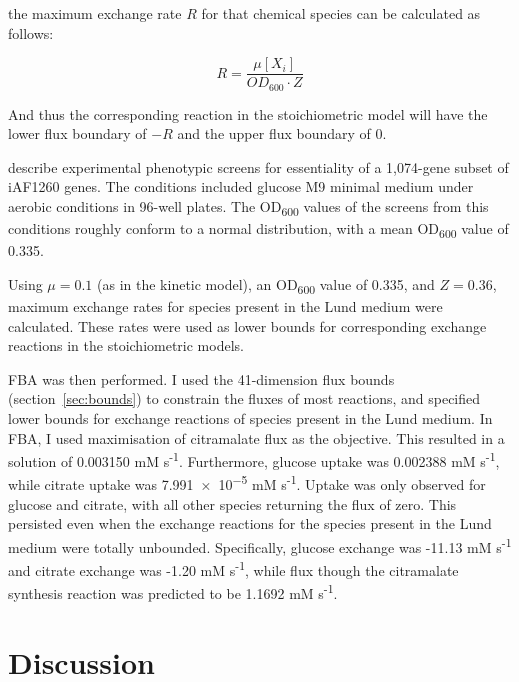 \documentclass[parskip=full, numbers=noenddot]{scrreprt}
\begin{document}
the maximum exchange rate $R$ for that chemical species can be calculated as follows:

\[
  R = \frac{\mu[X_{i}]}{OD_{600} \cdot Z}
\]

And thus the corresponding reaction in the stoichiometric model will have the lower flux boundary of $-R$ and the upper flux boundary of 0.

\citet{orth_comprehensive_2011} describe experimental phenotypic screens for essentiality of a 1,074-gene subset of iAF1260 genes. The conditions included glucose M9 minimal medium under aerobic conditions in 96-well plates. The OD\textsubscript{600} values of the screens from this conditions roughly conform to a normal distribution, with a mean OD\textsubscript{600} value of 0.335.

Using $\mu = 0.1$ (as in the kinetic model), an OD\textsubscript{600} value of 0.335, and $Z = 0.36$, maximum exchange rates for species present in the Lund medium were calculated. These rates were used as lower bounds for corresponding exchange reactions in the stoichiometric models.

FBA was then performed. I used the 41-dimension flux bounds (section~\ref{sec:bounds}) to constrain the fluxes of most reactions, and specified lower bounds for exchange reactions of species present in the Lund medium. In FBA, I used maximisation of citramalate flux as the objective. This resulted in a solution of 0.003150 mM s\textsuperscript{-1}. Furthermore, glucose uptake was 0.002388 mM s\textsuperscript{-1}, while citrate uptake was \num{7.991e-5} mM s\textsuperscript{-1}. Uptake was only observed for glucose and citrate, with all other species returning the flux of zero. This persisted even when the exchange reactions for the species present in the Lund medium were totally unbounded. Specifically, glucose exchange was -11.13 mM s\textsuperscript{-1} and citrate exchange was -1.20 mM s\textsuperscript{-1}, while flux though the citramalate synthesis reaction was predicted to be 1.1692 mM s\textsuperscript{-1}.

\chapter{Discussion}
\label{ch:discussion}


\end{document}
